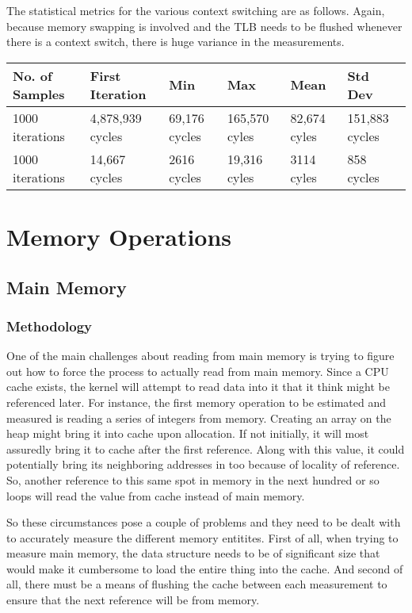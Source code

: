 \documentclass[paper=a4, fontsize=11pt]{scrartcl}
\numberwithin{equation}{section}        %
\numberwithin{figure}{section}          %
\numberwithin{table}{section}               %
\begin{document}
The statistical metrics for the various context switching are as follows.  Again, because memory swapping is involved and the TLB needs to be flushed whenever there is a context switch, there is huge variance in the measurements.

\begin{center}
    \begin{tabular}{ | l | l | l | l | l | l |}
    \hline
    No. of Samples & First Iteration & Min & Max & Mean & Std Dev \\ \hline
    1000 iterations & 4,878,939 cycles & 69,176 cycles & 165,570 cyles & 82,674 cyles & 151,883  cycles \\ 
    1000 iterations & 14,667 cycles & 2616 cycles & 19,316 cyles & 3114 cyles & 858 cycles \\ 
    \hline
    \end{tabular}
\end{center}

\section{Memory Operations}

\subsection{Main Memory}

\subsubsection{Methodology}

One of the main challenges about reading from main memory is trying to figure out how to force the process to actually read from main memory.  Since a CPU cache exists, the kernel will attempt to read data into it that it think might be referenced later.  For instance, the first memory operation to be estimated and measured is reading a series of integers from memory.  Creating an array on the heap might bring it into cache upon allocation.  If not initially, it will most assuredly bring it to cache after the first reference.  Along with this value, it could potentially bring its neighboring addresses in too because of locality of reference.  So, another reference to this same spot in memory in the next hundred or so loops will read the value from cache instead of main memory.

So these circumstances pose a couple of problems and they need to be dealt with to accurately measure the different memory entitites.  First of all, when trying to measure main memory, the data structure needs to be of significant size that would make it cumbersome to load the entire thing into the cache.  And second of all, there must be a means of flushing the cache between each measurement to ensure that the next reference will be from memory.
\end{document}
